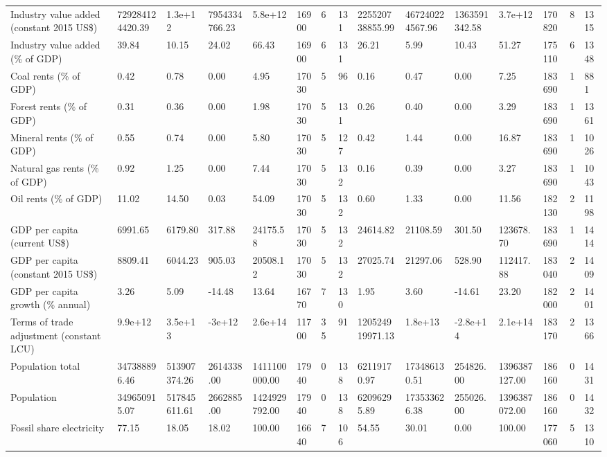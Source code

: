 \begin{longtable}{lllllllllllllll}
Industry value added (constant 2015 US\$) & 729284124420.39 & 1.3e+12 & 7954334766.23 & 5.8e+12 & 16900 & 6 & 131 & 225520738855.99 & 467240224567.96 & 1363591342.58 & 3.7e+12 & 170820 & 8 & 1315\\
Industry value added (\% of GDP) & 39.84 & 10.15 & 24.02 & 66.43 & 16900 & 6 & 131 & 26.21 & 5.99 & 10.43 & 51.27 & 175110 & 6 & 1348\\
Coal rents (\% of GDP) & 0.42 & 0.78 & 0.00 & 4.95 & 17030 & 5 & 96 & 0.16 & 0.47 & 0.00 & 7.25 & 183690 & 1 & 881\\
Forest rents (\% of GDP) & 0.31 & 0.36 & 0.00 & 1.98 & 17030 & 5 & 131 & 0.26 & 0.40 & 0.00 & 3.29 & 183690 & 1 & 1361\\
\addlinespace
Mineral rents (\% of GDP) & 0.55 & 0.74 & 0.00 & 5.80 & 17030 & 5 & 127 & 0.42 & 1.44 & 0.00 & 16.87 & 183690 & 1 & 1026\\
Natural gas rents (\% of GDP) & 0.92 & 1.25 & 0.00 & 7.44 & 17030 & 5 & 132 & 0.16 & 0.39 & 0.00 & 3.27 & 183690 & 1 & 1043\\
Oil rents (\% of GDP) & 11.02 & 14.50 & 0.03 & 54.09 & 17030 & 5 & 132 & 0.60 & 1.33 & 0.00 & 11.56 & 182130 & 2 & 1198\\
GDP per capita (current US\$) & 6991.65 & 6179.80 & 317.88 & 24175.58 & 17030 & 5 & 132 & 24614.82 & 21108.59 & 301.50 & 123678.70 & 183690 & 1 & 1414\\
GDP per capita (constant 2015 US\$) & 8809.41 & 6044.23 & 905.03 & 20508.12 & 17030 & 5 & 132 & 27025.74 & 21297.06 & 528.90 & 112417.88 & 183040 & 2 & 1409\\
\addlinespace
GDP per capita growth (\% annual) & 3.26 & 5.09 & -14.48 & 13.64 & 16770 & 7 & 130 & 1.95 & 3.60 & -14.61 & 23.20 & 182000 & 2 & 1401\\
Terms of trade adjustment (constant LCU) & 9.9e+12 & 3.5e+13 & -3e+12 & 2.6e+14 & 11700 & 35 & 91 & 120524919971.13 & 1.8e+13 & -2.8e+14 & 2.1e+14 & 183170 & 2 & 1366\\
Population total & 347388896.46 & 513907374.26 & 2614338.00 & 1411100000.00 & 17940 & 0 & 138 & 62119170.97 & 173486130.51 & 254826.00 & 1396387127.00 & 186160 & 0 & 1431\\
Population & 349650915.07 & 517845611.61 & 2662885.00 & 1424929792.00 & 17940 & 0 & 138 & 62096295.89 & 173533626.38 & 255026.00 & 1396387072.00 & 186160 & 0 & 1432\\
Fossil share electricity & 77.15 & 18.05 & 18.02 & 100.00 & 16640 & 7 & 106 & 54.55 & 30.01 & 0.00 & 100.00 & 177060 & 5 & 1310\\

\end{longtable}
